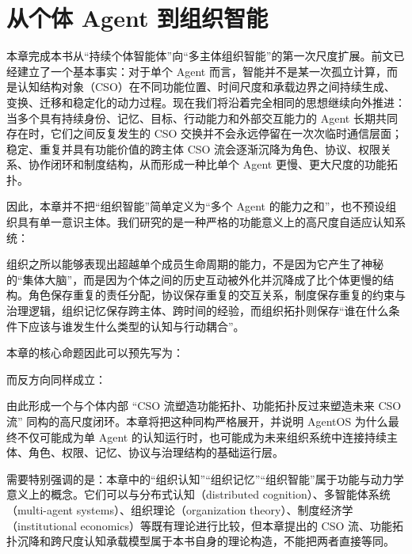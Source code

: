 \chapter{从个体 Agent 到组织智能}
\label{chap:from-agent-to-organization}

\begin{chapterlead}
本章完成本书从“持续个体智能体”向“多主体组织智能”的第一次尺度扩展。前文已经建立了一个基本事实：对于单个 Agent 而言，智能并不是某一次孤立计算，而是认知结构对象（CSO）在不同功能位置、时间尺度和承载边界之间持续生成、变换、迁移和稳定化的动力过程。现在我们将沿着完全相同的思想继续向外推进：当多个具有持续身份、记忆、目标、行动能力和外部交互能力的 Agent 长期共同存在时，它们之间反复发生的 CSO 交换并不会永远停留在一次次临时通信层面；稳定、重复并具有功能价值的跨主体 CSO 流会逐渐沉降为角色、协议、权限关系、协作闭环和制度结构，从而形成一种比单个 Agent 更慢、更大尺度的功能拓扑。

因此，本章并不把“组织智能”简单定义为“多个 Agent 的能力之和”，也不预设组织具有单一意识主体。我们研究的是一种严格的功能意义上的高尺度自适应认知系统：
\begin{statementbox}
\centering
{}
\end{statementbox}
组织之所以能够表现出超越单个成员生命周期的能力，不是因为它产生了神秘的“集体大脑”，而是因为个体之间的历史互动被外化并沉降成了比个体更慢的结构。角色保存重复的责任分配，协议保存重复的交互关系，制度保存重复的约束与治理逻辑，组织记忆保存跨主体、跨时间的经验，而组织拓扑则保存“谁在什么条件下应该与谁发生什么类型的认知与行动耦合”。

本章的核心命题因此可以预先写为：
\begin{statementbox}
\centering
{}
\end{statementbox}
而反方向同样成立：
\begin{statementbox}
\centering
{}
\end{statementbox}
由此形成一个与个体内部 ``CSO 流塑造功能拓扑、功能拓扑反过来塑造未来 CSO 流'' 同构的高尺度闭环。本章将把这种同构严格展开，并说明 AgentOS 为什么最终不仅可能成为单 Agent 的认知运行时，也可能成为未来组织系统中连接持续主体、角色、权限、记忆、协议与治理结构的基础运行层。

需要特别强调的是：本章中的“组织认知”“组织记忆”“组织智能”属于功能与动力学意义上的概念。它们可以与分布式认知（distributed cognition）、多智能体系统（multi-agent systems）、组织理论（organization theory）、制度经济学（institutional economics）等既有理论进行比较，但本章提出的 CSO 流、功能拓扑沉降和跨尺度认知承载模型属于本书自身的理论构造，不能把两者直接等同。
\end{chapterlead}



